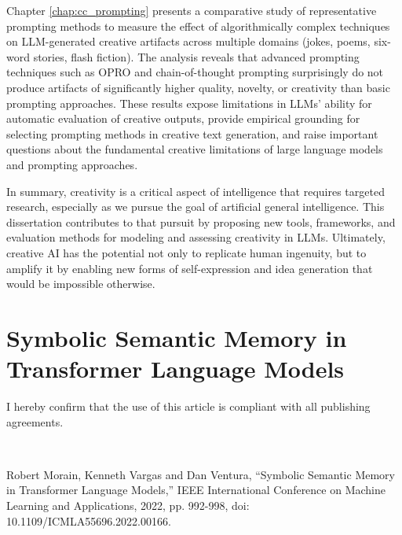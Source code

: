 \documentclass[phd,electronic,oneside,twosidetoc,letterpaper,chaptercenter,parttop,lof]{byumsphd}
\begin{document}
Chapter \ref{chap:cc_prompting} presents a comparative study of representative prompting methods to measure the effect of algorithmically complex techniques on LLM-generated creative artifacts across multiple domains (jokes, poems, six-word stories, flash fiction). 
The analysis reveals that advanced prompting techniques such as OPRO and chain-of-thought prompting surprisingly do not produce artifacts of significantly higher quality, novelty, or creativity than basic prompting approaches. 
These results expose limitations in LLMs' ability for automatic evaluation of creative outputs, provide empirical grounding for selecting prompting methods in creative text generation, and raise important questions about the fundamental creative limitations of large language models and prompting approaches.

In summary, creativity is a critical aspect of intelligence that requires targeted research, especially as we pursue the goal of artificial general intelligence. 
This dissertation contributes to that pursuit by proposing new tools, frameworks, and evaluation methods for modeling and assessing creativity in LLMs. 
Ultimately, creative AI has the potential not only to replicate human ingenuity, but to amplify it by enabling new forms of self-expression and idea generation that would be impossible otherwise.


\chapter{Symbolic Semantic Memory in Transformer Language Models} 
\label{chap:ssm}

I hereby confirm that the use of this article is compliant with all publishing agreements.

\

\noindent
Robert Morain, Kenneth Vargas and Dan Ventura, ``Symbolic Semantic Memory in Transformer Language Models,'' IEEE International Conference on Machine Learning and Applications, 2022, pp. 992-998, doi: 10.1109/ICMLA55696.2022.00166. 


\newcommand{\LMLossPercentageDecrease}{81.04\%}

\end{document}
